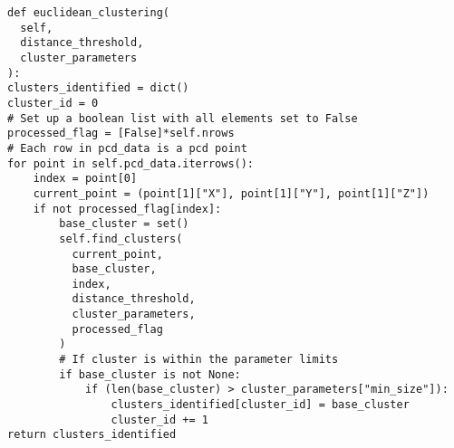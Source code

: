 \begin{lstlisting}
def euclidean_clustering(
  self, 
  distance_threshold, 
  cluster_parameters
):
clusters_identified = dict()
cluster_id = 0
# Set up a boolean list with all elements set to False
processed_flag = [False]*self.nrows
# Each row in pcd_data is a pcd point
for point in self.pcd_data.iterrows():
    index = point[0]
    current_point = (point[1]["X"], point[1]["Y"], point[1]["Z"])
    if not processed_flag[index]:
        base_cluster = set()
        self.find_clusters(
          current_point, 
          base_cluster, 
          index, 
          distance_threshold, 
          cluster_parameters, 
          processed_flag
        )
        # If cluster is within the parameter limits
        if base_cluster is not None:
            if (len(base_cluster) > cluster_parameters["min_size"]):
                clusters_identified[cluster_id] = base_cluster
                cluster_id += 1
return clusters_identified
\end{lstlisting}
